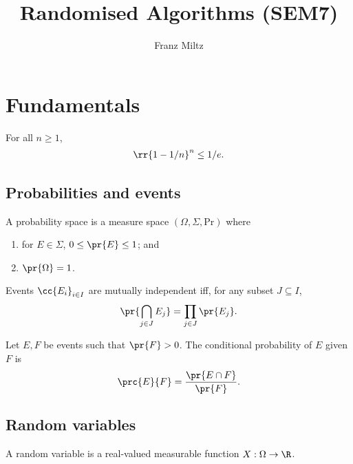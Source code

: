 \documentclass{article}
\title{Randomised Algorithms (SEM7)}
\author{Franz Miltz}
\begin{document}
\maketitle
\tableofcontents
\pagebreak

\section{Fundamentals}

\begin{lemma}
  For all $n\geq 1$,
  \begin{align*}
    \rr{1-1/n}^n \leq 1/e.
  \end{align*}
\end{lemma}

\subsection{Probabilities and events}

\begin{definition}
  A probability space is a measure space $(\Omega,\Sigma,\text{Pr})$ where
  \begin{enumerate}
    \item for $E\in\Sigma$, $0\leq\pr{E}\leq 1$; and
    \item $\pr{\Omega} = 1$.
  \end{enumerate}
\end{definition}

\begin{definition}
  Events $\cc{E_i}_{i\in I}$ are mutually independent iff, for any subset
  $J\subseteq I$,
  \begin{align*}
    \pr{\bigcap_{j\in J}E_j} = \prod_{j\in J} \pr{E_j}.
  \end{align*}
\end{definition}

\begin{definition}
  Let $E,F$ be events such that $\pr{F}>0$. The conditional probability of $E$ given $F$ is
  \begin{align*}
    \prc{E}{F} = \frac{\pr{E\cap F}}{\pr{F}}.
  \end{align*}
\end{definition}

\subsection{Random variables}

\begin{definition}
  A random variable is a real-valued measurable function $X:\Omega\to\R$.
\end{definition}
\end{document}
